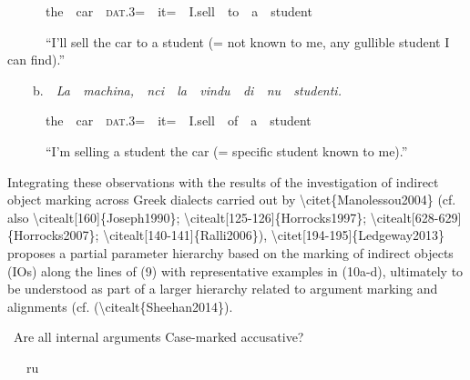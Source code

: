 \documentclass[output=paper,modfonts,nonflat]{langsci/langscibook}
\begin{document}
\begin{styleesempi}
\ \ \ \ \ \ the\ \ car\ \ \textsc{dat}.3=\ \ it=\ \ I.sell\ \ to\ \ a\ \ student
\end{styleesempi}

\begin{styleesempi}
\ \ \ \ \ \ “I’ll sell the car to a student (= not known to me, any gullible student I can find).”
\end{styleesempi}

\begin{styleStandard}
\ \ \ \ b.\ \ \textit{La\ \ machina,\ \ nci\ \ la\ \ vindu\ \ di\ \ nu\ \ studenti.} 
\end{styleStandard}

\begin{styleesempi}
\ \ \ \ \ \ the\ \ car\ \ \textsc{dat}.3=\ \ it=\ \ I.sell\ \ of\ \ a\ \ student
\end{styleesempi}

\begin{styleesempi}
\ \ \ \ \ \ “I’m selling a student the car (= specific student known to me).”
\end{styleesempi}

\begin{styleStandard}
Integrating these observations with the results of the investigation of indirect object marking across Greek dialects carried out by {\textbackslash}citet\{Manolessou2004\} (cf. also {\textbackslash}citealt[160]\{Joseph1990\}; {\textbackslash}citealt[125-126]\{Horrocks1997\}; {\textbackslash}citealt[628-629]\{Horrocks2007\}; {\textbackslash}citealt[140-141]\{Ralli2006\}), {\textbackslash}citet[194-195]\{Ledgeway2013\} proposes a partial parameter hierarchy based on the marking of indirect objects (IOs) along the lines of (9) with representative examples in (10a-d), ultimately to be understood as part of a larger hierarchy related to argument marking and alignments (cf. ({\textbackslash}citealt\{Sheehan2014\}).
\end{styleStandard}

\begin{listWWNumviiileveli}
\item 
\begin{styleListParagraph}
\ Are all internal arguments Case-marked accusative?
\end{styleListParagraph}
\end{listWWNumviiileveli}
\begin{styleStandard}
\ \  \ ru
\end{styleStandard}
\end{document}
